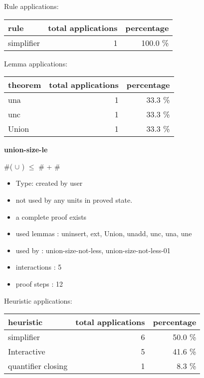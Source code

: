 \documentclass[a4paper]{article}
\begin{document}
Rule applications:

\begin{supertabular}{l|r|r}
rule	        & total applications & percentage \\ \hline
simplifier & 1 & 100.0 \% \\

\end{supertabular}

Lemma applications:

\begin{supertabular}{l|r|r}
theorem	        & total applications & percentage \\ \hline
una & 1 & 33.3 \% \\
unc & 1 & 33.3 \% \\
Union & 1 & 33.3 \% \\

\end{supertabular}
\pagebreak

{\LARGE\bf union-size-le}\label{lemma-union-size-le}

\medskip

 \Fol \#( $\cup$ ) $\le$ \#  + \# 

\begin{itemize}

\item Type: created by user

\item not used by any units in proved state.
\item       a complete proof exists
\item       used lemmas  : uninsert, ext, Union, unadd, unc, una, une
\item       used by      : union-size-not-less, union-size-not-less-01
\item       interactions : 5
\item       proof steps  : 12
\end{itemize}

\medskip


Heuristic applications:

\begin{supertabular}{l|r|r}
heuristic	& total applications & percentage \\ \hline
simplifier & 6 & 50.0 \% \\
Interactive & 5 & 41.6 \% \\
quantifier closing & 1 & 8.3 \% \\

\end{supertabular}
\end{document}
